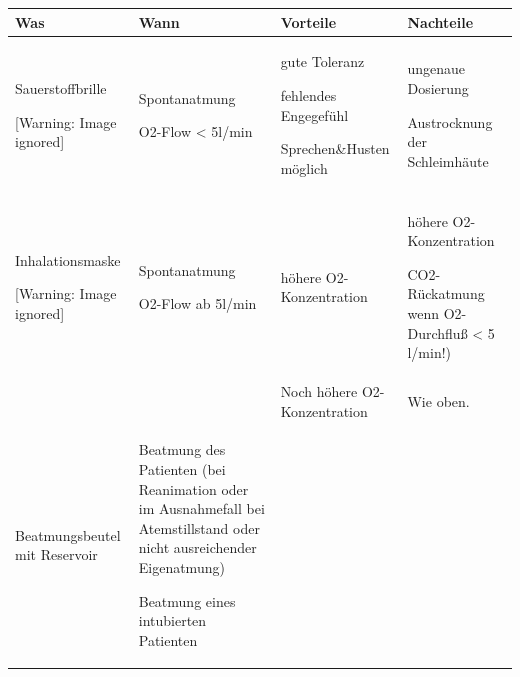 \documentclass{article}
\begin{document}
\begin{center}
\tablehead{}\begin{supertabular}{|m{3.225cm}|m{3.225cm}|m{3.225cm}|m{3.225cm}|}
\hline
\centering Was\par

 &
\centering Wann\par

 &
\centering Vorteile\par

 &
\centering Nachteile\par

\\\hline
\centering Sauerstoffbrille\par



\begin{center}
 [Warning: Image ignored] %

\end{center}
 &
Spontanatmung

O2-Flow {\textless} 5l/min

 &
gute Toleranz

fehlendes Engegef\"uhl

Sprechen\&Husten m\"oglich

 &
ungenaue Dosierung

Austrocknung  der Schleimh\"aute

\\\hline
\centering Inhalationsmaske\par



\begin{center}
 [Warning: Image ignored] %

\end{center}
 &
Spontanatmung

O2-Flow ab 5l/min

 &
h\"ohere O2{}-Konzentration

 &
h\"ohere O2{}-Konzentration

CO2{}-R\"uckatmung  wenn O2{}-Durchflu{\ss} {\textless} 5 l/min!)

\\%
 

 &
 &
Noch h\"ohere O2{}-Konzentration

 &
Wie oben.

\\\hline
\centering Beatmungsbeutel mit  Reservoir\par

 &
Beatmung des Patienten (bei Reanimation oder im Ausnahmefall bei
Atemstillstand oder nicht ausreichender Eigenatmung)

Beatmung eines intubierten Patienten

 &
 &
\\\hline
\end{supertabular}
\end{center}
\end{document}
